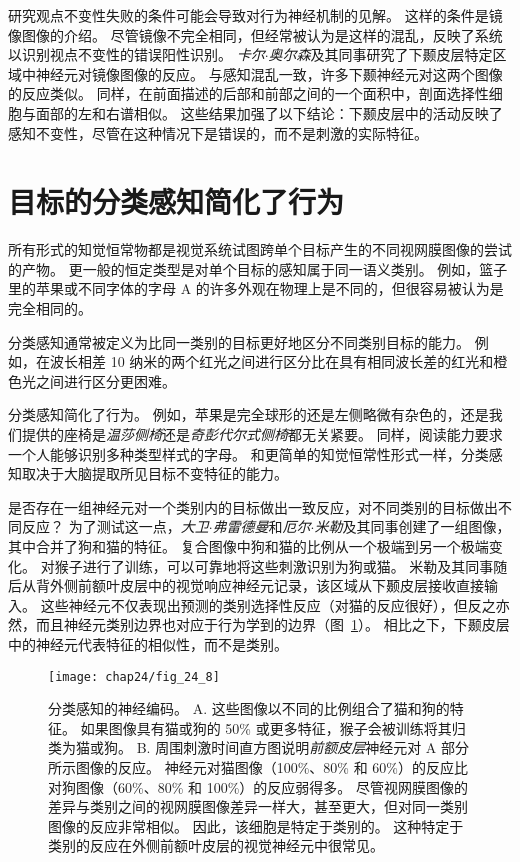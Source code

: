 研究观点不变性失败的条件可能会导致对行为神经机制的见解。
这样的条件是镜像图像的介绍。
尽管镜像不完全相同，但经常被认为是这样的混乱，反映了系统以识别视点不变性的错误阳性识别。
\textit{卡尔$\cdot$奥尔森}及其同事研究了下颞皮层特定区域中神经元对镜像图像的反应。
与感知混乱一致，许多下颞神经元对这两个图像的反应类似。
同样，在前面描述的后部和前部之间的一个面积中，剖面选择性细胞与面部的左和右谱相似。
这些结果加强了以下结论：下颞皮层中的活动反映了感知不变性，尽管在这种情况下是错误的，而不是刺激的实际特征。



\section{目标的分类感知简化了行为}

所有形式的知觉恒常物都是视觉系统试图跨单个目标产生的不同视网膜图像的尝试的产物。
更一般的恒定类型是对单个目标的感知属于同一语义类别。
例如，篮子里的苹果或不同字体的字母 A 的许多外观在物理上是不同的，但很容易被认为是完全相同的。


分类感知通常被定义为比同一类别的目标更好地区分不同类别目标的能力。
例如，在波长相差 10 纳米的两个红光之间进行区分比在具有相同波长差的红光和橙色光之间进行区分更困难。


分类感知简化了行为。
例如，苹果是完全球形的还是左侧略微有杂色的，还是我们提供的座椅是\textit{温莎侧椅}还是\textit{奇彭代尔式侧椅}都无关紧要。
同样，阅读能力要求一个人能够识别多种类型样式的字母。
和更简单的知觉恒常性形式一样，分类感知取决于大脑提取所见目标不变特征的能力。


是否存在一组神经元对一个类别内的目标做出一致反应，对不同类别的目标做出不同反应？
为了测试这一点，\textit{大卫$\cdot$弗雷德曼}和\textit{厄尔$\cdot$米勒}及其同事创建了一组图像，其中合并了狗和猫的特征。
复合图像中狗和猫的比例从一个极端到另一个极端变化。 
对猴子进行了训练，可以可靠地将这些刺激识别为狗或猫。
米勒及其同事随后从背外侧前额叶皮层中的视觉响应神经元记录，该区域从下颞皮层接收直接输入。
这些神经元不仅表现出预测的类别选择性反应（对猫的反应很好），但反之亦然，而且神经元类别边界也对应于行为学到的边界（图~\ref{fig:24_8}）。 
相比之下，下颞皮层中的神经元代表特征的相似性，而不是类别。


\begin{figure}[htbp]
	\centering
	\texttt{[image: chap24/fig\_24\_8]}
	\caption{分类感知的神经编码。
		A. 这些图像以不同的比例组合了猫和狗的特征。
		如果图像具有猫或狗的 50\% 或更多特征，猴子会被训练将其归类为猫或狗。
		B. 周围刺激时间直方图说明\textit{前额皮层}神经元对 A 部分所示图像的反应。
		神经元对猫图像（100\%、80\% 和 60\%）的反应比对狗图像（60\%、80\% 和 100\%）的反应弱得多。
		尽管视网膜图像的差异与类别之间的视网膜图像差异一样大，甚至更大，但对同一类别图像的反应非常相似。
		因此，该细胞是特定于类别的。
		这种特定于类别的反应在外侧前额叶皮层的视觉神经元中很常见。}
	\label{fig:24_8}
\end{figure}


